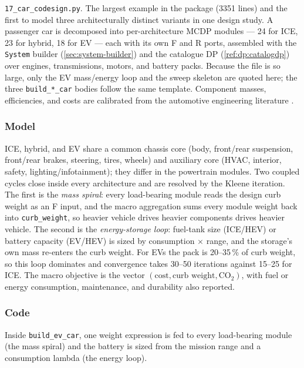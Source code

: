 \documentclass[11pt,a4paper]{article}
\begin{document}
\texttt{17\_car\_codesign.py}. The largest example in the package
(3351 lines) and the first to model three architecturally distinct
variants in one design study. A passenger car is decomposed into
per-architecture MCDP modules --- 24 for ICE, 23 for hybrid, 18 for EV
--- each with its own F and R ports, assembled with the \texttt{System}
builder (\ref{sec:system-builder}) and the catalogue DP
(\ref{ref:dp:catalogdp}) over engines, transmissions, motors, and
battery packs. Because the file is so large, only the EV mass/energy
loop and the sweep skeleton are quoted here; the three
\texttt{build\_*\_car} bodies follow the same template. Component masses,
efficiencies, and costs are calibrated from the automotive engineering
literature
\citep{genta2009chassis,bosch2018handbook,pulkrabek2003engine,heywood2018ice,%
hofmann2014hybrid,naunheimer2011transmissions,iea2023evoutlook,nemry2008cars,%
epa2024trends,larminie2012ev,mock2023pocketbook}.

\subsubsection*{Model}

ICE, hybrid, and EV share a common chassis core (body, front/rear
suspension, front/rear brakes, steering, tires, wheels) and auxiliary
core (HVAC, interior, safety, lighting/infotainment); they differ in
the powertrain modules. Two coupled cycles close inside every
architecture and are resolved by the Kleene iteration. The first is the
\emph{mass spiral}: every load-bearing module reads the design curb
weight as an F input, and the macro aggregation sums every module
weight back into \texttt{curb\_weight}, so heavier vehicle drives
heavier components drives heavier vehicle. The second is the
\emph{energy-storage loop}: fuel-tank size (ICE/HEV) or battery
capacity (EV/HEV) is sized by consumption $\times$ range, and the
storage's own mass re-enters the curb weight. For EVs the pack is
20--35\,\% of curb weight, so this loop dominates and convergence takes
30--50 iterations against 15--25 for ICE. The macro objective is the
vector $(\text{cost}, \text{curb weight}, \text{CO}_2)$, with fuel or
energy consumption, maintenance, and durability also reported.

\subsubsection*{Code}

Inside \texttt{build\_ev\_car}, one weight expression is fed to every
load-bearing module (the mass spiral) and the battery is sized from the
mission range and a consumption lambda (the energy loop).
\end{document}
